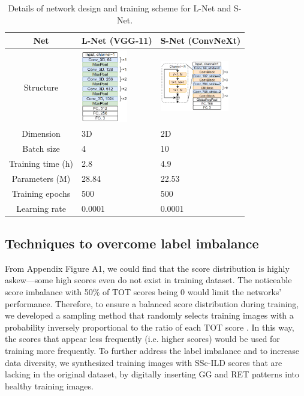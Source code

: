 \begin{table}[]
\centering
\caption{Details of network design and training scheme for L-Net and S-Net.}
\label{table: netdesign}
\begin{tabular}{c<{\centering}m{2cm}<{\centering}m{3cm}<{\centering}}
\hline
\centering Net                     & L-Net (VGG-11) & S-Net (ConvNeXt) \\ \hline
\centering Structure & \includegraphics[width=2cm]{lnet.png}               &  \includegraphics[width=3cm]{snet.png}                \\
\centering Dimension               & 3D             & 2D               \\
\centering Batch size              & 4              & 10               \\
\centering Training time (h)       & 2.8            & 4.9              \\
\centering Parameters (M)          & 28.84          & 22.53            \\
\centering Training epochs         & 500            & 500              \\
\centering Learning rate           & 0.0001         & 0.0001           \\ \hline
\end{tabular}
\end{table}


\subsection{Techniques to overcome label imbalance}
From Appendix Figure A1, we could find that the score distribution is highly askew—some high scores even do not exist in training dataset. The noticeable score imbalance with 50\% of TOT scores being 0 would limit the networks’ performance. Therefore, to ensure a balanced score distribution during training, we developed a sampling method that randomly selects training images with a probability inversely proportional to the ratio of each TOT score \cite{zhang2019balance}. In this way, the scores that appear less frequently (i.e. higher scores) would be used for training more frequently. To further address the label imbalance and to increase data diversity, we synthesized training images with SSc-ILD scores that are lacking in the original dataset, by digitally inserting GG and RET patterns into healthy training images.



